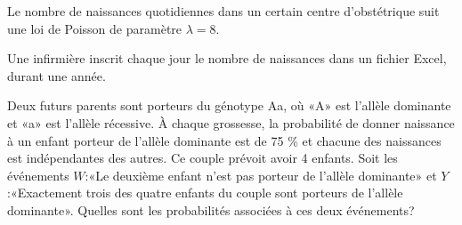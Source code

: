 \begin{questions}
\pageblanche
\question Le nombre de naissances quotidiennes dans un certain centre d’obstétrique suit une loi de Poisson de paramètre $\lambda=8$.
\medskip
{}
Une infirmière inscrit chaque jour le nombre de naissances dans un fichier Excel, durant une année.

\pageblanche
\question[3] Deux futurs parents sont porteurs du génotype Aa, où «A» est l'allèle dominante et «a» est l'allèle récessive. À chaque grossesse, la probabilité de donner naissance à un enfant porteur de l'allèle dominante est de 75 \% et chacune des naissances est indépendantes des autres. Ce couple prévoit avoir 4 enfants. Soit les événements $W$:«Le deuxième enfant n'est pas porteur de l'allèle dominante» et $Y$:«Exactement trois des quatre enfants du couple sont porteurs de l'allèle dominante». Quelles sont les probabilités associées à ces deux événements?


\end{questions}
